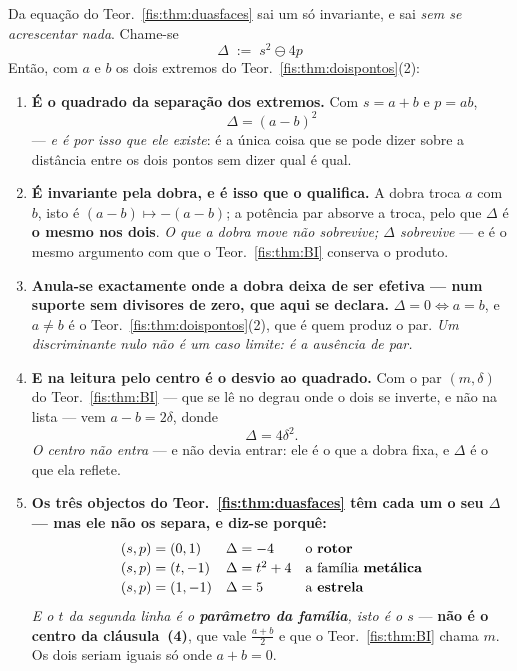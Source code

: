 \documentclass[livro.tex]{subfiles}
\begin{document}
\begin{corolario}\label{fis:cor:disc}
Da equação do Teor.~\ref{fis:thm:duasfaces} sai um só invariante, e sai
\emph{sem se acrescentar nada}. Chame-se
\[
\boxed{\;\Delta\;:=\;s^{2}\ominus 4p\;}
\]
Então, com $a$ e $b$ os dois extremos do Teor.~\ref{fis:thm:doispontos}(2):
\begin{enumerate}\itemsep3pt
\item[(1)] \textbf{É o quadrado da separação dos extremos.} Com $s=a+b$ e
$p=ab$,
\[
\boxed{\;\Delta=(a-b)^{2}\;}
\]
--- \emph{e é por isso que ele existe}: é a única coisa que se pode dizer sobre a
distância entre os dois pontos sem dizer qual é qual.
\item[(2)] \textbf{É invariante pela dobra, e é isso que o qualifica.} A dobra
troca $a$ com $b$, isto é $(a-b)\mapsto-(a-b)$; a potência par absorve a troca,
pelo que $\Delta$ é \textbf{o mesmo nos dois}. \emph{O que a dobra move não
sobrevive; $\Delta$ sobrevive} --- e é o mesmo argumento com que o
Teor.~\ref{fis:thm:BI} conserva o produto.
\item[(3)] \textbf{Anula-se exactamente onde a dobra deixa de ser efetiva ---
num suporte sem divisores de zero, que aqui se declara.} $\Delta=0\iff a=b$, e
$a\neq b$ é o Teor.~\ref{fis:thm:doispontos}(2), que é quem produz o par.
\emph{Um discriminante nulo não é um caso limite: é a ausência de par.}
\item[(4)] \textbf{E na leitura pelo centro é o desvio ao quadrado.} Com o par
$(m,\delta)$ do Teor.~\ref{fis:thm:BI} --- que se lê no degrau onde o dois se
inverte, e não na lista --- vem $a-b=2\delta$, donde
\[
\Delta=4\delta^{2} .
\]
\emph{O centro não entra} --- e não devia entrar: ele é o que a dobra fixa, e
$\Delta$ é o que ela reflete.
\item[(5)] \textbf{Os três objectos do Teor.~\ref{fis:thm:duasfaces} têm cada
um o seu $\Delta$ --- mas ele não os separa, e diz-se porquê:}
\[
\begin{array}{lll}
(s,p)=(0,1) & \Delta=-4 & \text{o \textbf{rotor}}\\[2pt]
(s,p)=(t,-1) & \Delta=t^{2}+4 & \text{a família \textbf{metálica}}\\[2pt]
(s,p)=(1,-1) & \Delta=5 & \text{a \textbf{estrela}}
\end{array}
\]
\emph{E o $t$ da segunda linha é o \textbf{parâmetro da família}, isto é o $s$}
--- \textbf{não é o centro da cláusula~(4)}, que vale $\tfrac{a+b}{2}$ e que o
Teor.~\ref{fis:thm:BI} chama $m$. Os dois seriam iguais só onde $a+b=0$.

\end{enumerate}
\end{corolario}
\end{document}
